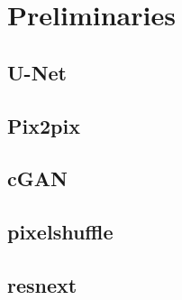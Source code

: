 \chapter{Preliminaries}
\label{chapterlabel2}

\section{U-Net}

\section{Pix2pix}

\section{cGAN}

\section{pixelshuffle}

\section{resnext}

